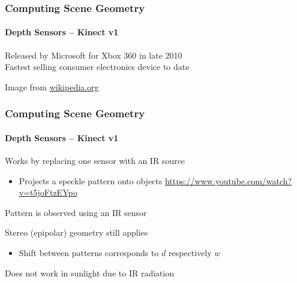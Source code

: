 \documentclass[xetex,professionalfont]{beamer}
\begin{document}
\begin{frame}
\frametitle{Computing Scene Geometry}
\framesubtitle{Depth Sensors -- Kinect v1}

Released by Microsoft for Xbox 360 in late 2010\\\medskip
Fastest selling consumer electronics device to date %

\bigskip
\begin{center}
    {\centering Image from \url{wikipedia.org}}
\end{center}

\end{frame}


\begin{frame}
\frametitle{Computing Scene Geometry}
\framesubtitle{Depth Sensors -- Kinect v1}

Works by replacing one sensor with an IR source
\begin{itemize}
    \item Projects a speckle pattern onto objects \url{https://www.youtube.com/watch?v=t5joFtzEYpo}
\end{itemize}

\bigskip
Pattern is observed using an IR sensor 

\bigskip
Stereo (epipolar) geometry still applies %
\begin{itemize}
    \item Shift between patterns corresponds to $d$ respectively $w$ %
\end{itemize}

\bigskip
Does not work in sunlight due to IR radiation %

\end{frame}

\end{document}
